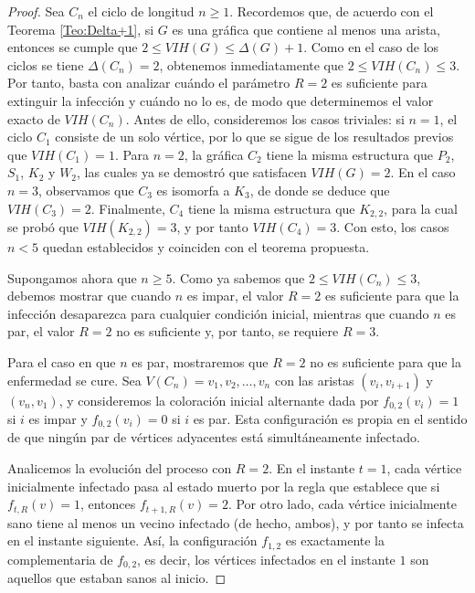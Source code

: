 \documentclass[12pt,titlepage,twoside,openright]{book}
\begin{document}
\begin{proof}
    Sea $C_n$ el ciclo de longitud $n\geq 1$. Recordemos que, de acuerdo con el Teorema \ref{Teo:Delta+1}, si $G$ es una gr\'afica que contiene al menos una arista, entonces se cumple que $2\leq VIH(G)\leq \Delta(G)+1$. Como en el caso de los ciclos se tiene $\Delta(C_n)=2$, obtenemos inmediatamente que $2\leq VIH(C_n)\leq 3$. Por tanto, basta con analizar cu\'ando el par\'ametro $R=2$ es suficiente para extinguir la infecci\'on y cu\'ando no lo es, de modo que determinemos el valor exacto de $VIH(C_n)$. Antes de ello, consideremos los casos triviales: si $n=1$, el ciclo $C_1$ consiste de un solo v\'ertice, por lo que se sigue de los resultados previos que $VIH(C_1)=1$. Para $n=2$, la gr\'afica $C_2$ tiene la misma estructura que $P_2$, $S_1$, $K_2$ y $W_2$, las cuales ya se demostr\'o que satisfacen $VIH(G)=2$. En el caso $n=3$, observamos que $C_3$ es isomorfa a $K_3$, de donde se deduce que $VIH(C_3)=2$. Finalmente, $C_4$ tiene la misma estructura que $K_{2,2}$, para la cual se prob\'o que $VIH(K_{2,2})=3$, y por tanto $VIH(C_4)=3$. Con esto, los casos $n<5$ quedan establecidos y coinciden con el teorema propuesta.

    Supongamos ahora que $n\geq5$. Como ya sabemos que $2\leq VIH(C_n)\leq 3$, debemos mostrar que cuando $n$ es impar, el valor $R=2$ es suficiente para que la infecci\'on desaparezca para cualquier condici\'on inicial, mientras que cuando $n$ es par, el valor $R=2$ no es suficiente y, por tanto, se requiere $R=3$.

    Para el caso en que $n$ es par, mostraremos que $R=2$ no es suficiente para que la enfermedad se cure. Sea $V(C_n)={v_1,v_2,\dots,v_n}$ con las aristas $(v_i,v_{i+1})$ y $(v_n,v_1)$, y consideremos la coloraci\'on inicial alternante dada por $f_{0,2}(v_i)=1$ si $i$ es impar y $f_{0,2}(v_i)=0$ si $i$ es par. Esta configuraci\'on es propia en el sentido de que ning\'un par de v\'ertices adyacentes est\'a simult\'aneamente infectado.

    Analicemos la evoluci\'on del proceso con $R=2$. En el instante $t=1$, cada v\'ertice inicialmente infectado pasa al estado muerto por la regla que establece que si $f_{t,R}(v)=1$, entonces $f_{t+1,R}(v)=2$. Por otro lado, cada v\'ertice inicialmente sano tiene al menos un vecino infectado (de hecho, ambos), y por tanto se infecta en el instante siguiente. As\'i, la configuraci\'on $f_{1,2}$ es exactamente la complementaria de $f_{0,2}$, es decir, los v\'ertices infectados en el instante $1$ son aquellos que estaban sanos al inicio. 
    

\end{proof}
\end{document}
